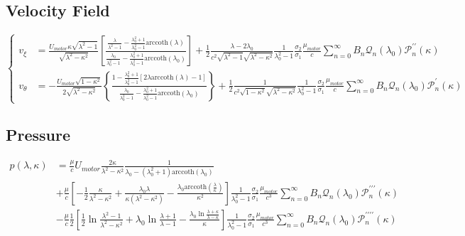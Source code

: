 \documentclass[fontsize=11pt, %
                             paper=a4, %
                             twoside, %
                             captions=tableheading,
                             index=totoc,
                             hyperref]{labbook}
\begin{document}
\subsection{Velocity Field}
\begin{equation}
\left\{
\begin{aligned}
v_\xi&=\frac{U_{motor}\kappa\sqrt{\lambda^2-1}}{\sqrt{\lambda^2-\kappa^2}}\left[\frac{\frac{\lambda}{\lambda^2-1}-\frac{\lambda_0^2+1}{\lambda_0^2-1}\mathrm{arccoth}(\lambda)}{\frac{\lambda_0}{\lambda_0^2-1}-\frac{\lambda_0^2+1}{\lambda_0^2-1}\mathrm{arccoth}(\lambda_0)}\right]+\frac{1}{2}\frac{\lambda-2\lambda_0}{c^2\sqrt{\lambda^2-1}\sqrt{\lambda^2-\kappa^2}}\frac{1}{\lambda_0^2-1}\frac{\sigma_2}{\sigma_1}\frac{\mu_{motor}}{c}\sum_{n=0}^\infty B_n\mathscr{Q}_n(\lambda_0)\mathscr{P}_n^{\prime\prime}(\kappa)\\
v_\theta&=-\frac{U_{motor}\sqrt{1-\kappa^2}}{2\sqrt{\lambda^2-\kappa^2}}\left\{\frac{1-\frac{\lambda_0^2+1}{\lambda_0^2-1}\left[2\lambda\mathrm{arccoth}(\lambda)-1\right]}{\frac{\lambda_0}{\lambda_0^2-1}-\frac{\lambda_0^2+1}{\lambda_0^2-1}\mathrm{arccoth}(\lambda_0)}\right\}+\frac{1}{2}\frac{1}{c^2\sqrt{1-\kappa^2}\sqrt{\lambda^2-\kappa^2}}\frac{1}{\lambda_0^2-1}\frac{\sigma_2}{\sigma_1}\frac{\mu_{motor}}{c}\sum_{n=0}^\infty B_n \mathscr{Q}_n(\lambda_0)\mathscr{P}_n^\prime(\kappa)
\end{aligned}
\right.
\end{equation}
\subsection{Pressure}
\begin{equation}
\begin{aligned}
p(\lambda,\kappa)&=\frac{\mu}{c}U_{motor}\frac{2\kappa}{\lambda^2-\kappa^2}\frac{1}{\lambda_0-(\lambda_0^2+1)\mathrm{arccoth}(\lambda_0)}\\
&+\frac{\mu}{c}
\left[-\frac{1}{2}\frac{\kappa}{\lambda^2-\kappa^2}+\frac{\lambda_0\lambda}{\kappa(\lambda^2-\kappa^2)}-\frac{\lambda_0\mathrm{arccoth}(\frac{\lambda}{\kappa})}{\kappa^2}\right]
\frac{1}{\lambda_0^2-1}\frac{\sigma_2}{\sigma_1}\frac{\mu_{motor}}{c^3}\sum_{n=0}^\infty B_n \mathscr{Q}_n(\lambda_0)\mathscr{P}_n^{\prime\prime\prime}(\kappa)\\
&-\frac{\mu}{c}\frac{1}{2}
\left[\frac{1}{2}\ln \frac{\lambda^2-1}{\lambda^2-\kappa^2}+\lambda_0\ln\frac{\lambda+1}{\lambda-1}-\frac{\lambda_0\ln\frac{\lambda+\kappa}{\lambda-\kappa}}{\kappa}\right]
\frac{1}{\lambda_0^2-1}\frac{\sigma_2}{\sigma_1}\frac{\mu_{motor}}{c^3}\sum_{n=0}^\infty B_n \mathscr{Q}_n(\lambda_0)\mathscr{P}_n^{\prime\prime\prime\prime}(\kappa)\\
\end{aligned}
\end{equation}
\end{document}
